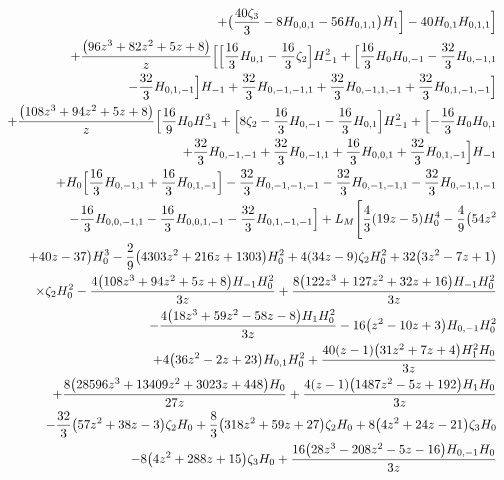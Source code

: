 \begin{eqnarray}
\nonumber \\ &&
+\big(\frac{40  \zeta_3}{3}-8 H_{0,0,1}-56 H_{0,1,1}\big) H_1\Bigr]-40 H_{0,1}H_{0,1,1}\Bigr]
\nonumber \\ &&
+\frac{\big(96 z^3+82 z^2+5 z+8\big)}{z}
 \Bigl[\Bigl[\frac{16}{3}   H_{0,1}-\frac{16}{3}  \zeta_2\Bigr]  H_{-1}^2+\Bigl[\frac{16}{3} H_0 H_{0,-1}-\frac{32}{3}   H_{0,-1,1}
\nonumber \\ &&
-\frac{32}{3}  H_{0,1,-1}\Bigr] H_{-1}+\frac{32}{3}   H_{0,-1,-1,1}+\frac{32}{3}  H_{0,-1,1,-1}+\frac{32}{3}   H_{0,1,-1,-1}\Bigr]
\nonumber \\ &&
+\frac{\big(108 z^3+94 z^2+5 z+8\big) }{z}
 \Bigl[\frac{16}{9} H_0 H_{-1}^3+\Bigl[8 \zeta_2-\frac{16}{3}  H_{0,-1}-\frac{16}{3} H_{0,1}\Bigr] H_{-1}^2+\Bigl[-\frac{16}{3}  H_0  H_{0,1}
\nonumber \\ &&
+\frac{32}{3} H_{0,-1,-1}+\frac{32}{3} H_{0,-1,1}+\frac{16}{3}   H_{0,0,1}+\frac{32}{3} H_{0,1,-1}\Bigr] H_{-1}
\nonumber \\ &&
+H_0 \Bigl[\frac{16}{3}  H_{0,-1,1}+\frac{16}{3}   H_{0,1,-1}\Bigr]-\frac{32}{3} H_{0,-1,-1,-1}-\frac{32}{3}  H_{0,-1,-1,1}-\frac{32}{3} H_{0,-1,1,-1}
\nonumber \\ &&
-\frac{16}{3}  H_{0,0,-1,1}-\frac{16}{3}   H_{0,0,1,-1}-\frac{32}{3} H_{0,1,-1,-1}
\Bigr]
+L_M \Biggl[\frac{4}{3} (19 z-5) H_0^4
-\frac{4}{9}\big(54 z^2
\nonumber \\ &&
+40 z-37\big) H_0^3
-\frac{2}{9} \big(4303 z^2+216 z+1303\big)H_0^2
+4  (34 z-9) \zeta_2 H_0^2+32 \big(3 z^2-7 z+1\big) 
\nonumber \\ &&
\times \zeta_2 H_0^2
-\frac{4 \big(108 z^3+94 z^2+5 z+8\big) H_{-1} H_0^2}{3 z}
+\frac{8   \big(122 z^3+127 z^2+32 z+16\big) H_{-1} H_0^2}{3 z}
\nonumber \\ &&
-\frac{4 \big(18  z^3+59 z^2-58 z-8\big) H_1 H_0^2}{3 z}
-16  \big(z^2-10 z+3\big)H_{0,-1} H_0^2
\nonumber \\ &&
+4 \big(36 z^2-2 z+23\big) H_{0,1} H_0^2+\frac{40 (z-1) \big(31  z^2+7 z+4\big) H_1^2 H_0}{3 z}
\nonumber \\ &&
+\frac{8 \big(28596 z^3+13409 z^2+3023  z+448\big) H_0}{27 z}
+\frac{4 (z-1) \big(1487 z^2-5 z+192\big) H_1 H_0}{3 z}
\nonumber \\ &&
-\frac{32}{3} \big(57 z^2+38 z-3\big) \zeta_2H_0
+\frac{8}{3}  \big(318 z^2+59 z+27\big) \zeta_2 H_0+8 \big(4 z^2+24 z-21\big) \zeta_3 H_0
\nonumber \\ &&
-8 \big(4 z^2+288 z+15\big) \zeta_3 H_0
+\frac{16   \big(28 z^3-208 z^2-5 z-16\big) H_{0,-1} H_0}{3 z}

\end{eqnarray}
